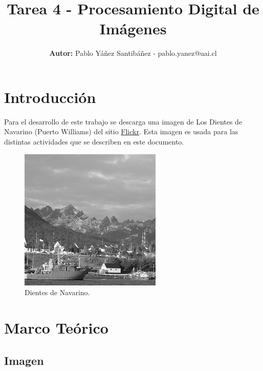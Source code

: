 \documentclass[
  letterpaper,
  twocolumn,
  9pt,
  journal,
  final]{IEEEtran}
\title{Tarea 4 - Procesamiento Digital de Imágenes}
\author{\textbf{Autor:} Pablo Yáñez Santibáñez - pablo.yanez@uai.cl}
\begin{document}
\maketitle


\tableofcontents




\section{Introducción}

Para el desarrollo de este trabajo se descarga una imagen de Los Dientes de Navarino (Puerto Williams) del sitio \href{https://www.flickr.com/photos/whitewizard/7062826349/in/album-72157629780861323/}{Flickr}. Esta imagen es usada para las distintas actividades que se describen en este documento.

\begin{figure}[h!]
	\centering
	\includegraphics[width=0.4\linewidth, trim={0cm 0cm 0cm 0cm}, clip]{outs/gaussiano/img.jpg}
	\caption{Dientes de Navarino.}
	\label{dientes}
\end{figure}

\section{Marco Teórico}

\subsection{Imagen}
\end{document}
